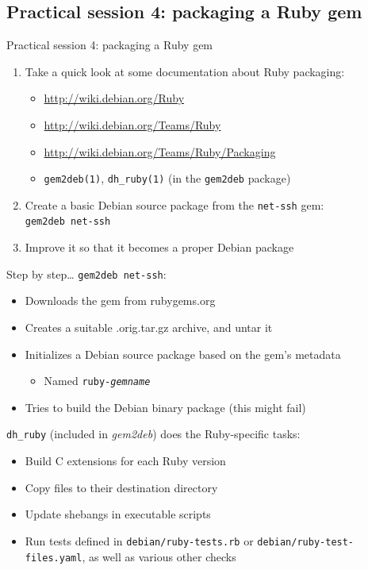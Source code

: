 \documentclass[10pt,final]{beamer}
\begin{document}
\subsection{Practical session 4: packaging a Ruby gem}
\begin{frame}{Practical session 4: packaging a Ruby gem}
\begin{enumerate}
	\item Take a quick look at some documentation about Ruby packaging:\\
		\begin{itemize}
		\item \url{http://wiki.debian.org/Ruby}
      \hbr
		\item \url{http://wiki.debian.org/Teams/Ruby}
      \hbr
		\item \url{http://wiki.debian.org/Teams/Ruby/Packaging}
      \hbr
		\item \texttt{gem2deb(1)}, \texttt{dh\_ruby(1)} (in the \texttt{gem2deb} package)
		\end{itemize}
		\hbr
	\item Create a basic Debian source package from the \texttt{net-ssh} gem:\\
		\texttt{gem2deb net-ssh}
	\hbr
	\item Improve it so that it becomes a proper Debian package
\end{enumerate}
\end{frame}

\begin{frame}{Step by step\ldots}
\texttt{gem2deb net-ssh}:
\begin{itemize}
\item Downloads the gem from rubygems.org
\item Creates a suitable .orig.tar.gz archive, and untar it
\item Initializes a Debian source package based on the gem's metadata
	\begin{itemize}
		\item Named \texttt{ruby-\textsl{gemname}}
	\end{itemize}
\item Tries to build the Debian binary package (this might fail)
\end{itemize}
\br
\texttt{dh\_ruby} (included in \textsl{gem2deb}) does the Ruby-specific tasks:
\begin{itemize}
	\item Build C extensions for each Ruby version
	\item Copy files to their destination directory
	\item Update shebangs in executable scripts
	\item Run tests defined in \texttt{debian/ruby-tests.rb} or \texttt{debian/ruby-test-files.yaml}, as well as various other checks
\end{itemize}
\end{frame}
\end{document}

